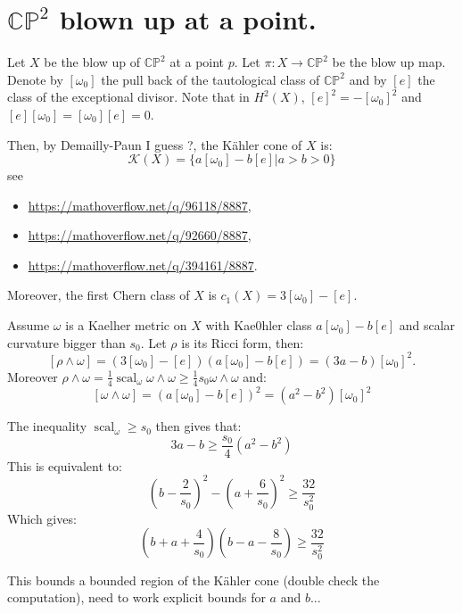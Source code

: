 \documentclass{amsart}
\numberwithin{equation}{section}
\theoremstyle{definition}
\DeclareMathOperator{\scal}{scal}
\begin{document}
\section{\texorpdfstring{$\mathbb{CP}^2$}{CP2} blown up at a point.}

Let $X$ be the blow up of $\mathbb{CP}^2$ at a point $p$. Let $\pi:X\to\mathbb{CP}^2$ be the blow up map. Denote by $[\omega_0]$ the pull back of the tautological class of $\mathbb{CP}^2$ and by $[e]$ the class of the exceptional divisor. Note that in $H^2(X)$, $[e]^2=-[\omega_0]^2$ and $[e][\omega_0]=[\omega_0][e]=0$.

Then, by Demailly-Paun I guess ?, the K\"ahler cone of $X$ is:
\[
\mathcal{K}(X)=\{a[\omega_0]-b[e]|a>b>0\}
\]
see
\begin{itemize}
\item \url{https://mathoverflow.net/q/96118/8887},
\item \url{https://mathoverflow.net/q/92660/8887},
\item \url{https://mathoverflow.net/q/394161/8887}.
\end{itemize}
Moreover, the first Chern class of $X$ is $c_1(X)=3[\omega_0]-[e]$.

Assume $\omega$ is a Kaelher metric on $X$ with Kae0hler class $a[\omega_0]-b[e]$ and scalar curvature bigger than $s_0$. Let $\rho$ is its Ricci form, then:
\[[\rho\wedge\omega]=(3[\omega_0]-[e])(a[\omega_0]-b[e])=(3a-b)[\omega_0]^2.\]
Moreover $\rho\wedge\omega=\tfrac{1}{4}\scal_\omega \omega\wedge\omega\geq\tfrac{1}{4} s_0\omega\wedge\omega$ and:
\[[\omega\wedge\omega]=(a[\omega_0]-b[e])^2=(a^2-b^2)[\omega_0]^2\]

The inequality $\scal_\omega\geq s_0$ then gives that:
\[3a-b\geq \frac{s_0}{4}(a^2-b^2)\]
This is equivalent to:
\[\left(b-\frac{2}{s_0}\right)^2-\left(a+\frac{6}{s_0}\right)^2\geq \frac{32}{s_0^2}\]
Which gives:
\[\left(b+a+\frac{4}{s_0}\right)\left(b-a-\frac{8}{s_0}\right)\geq\frac{32}{s_0^2} \]

This bounds a bounded region of the K\"ahler cone (double check the computation), need to work explicit bounds for $a$ and $b$...
\end{document}
